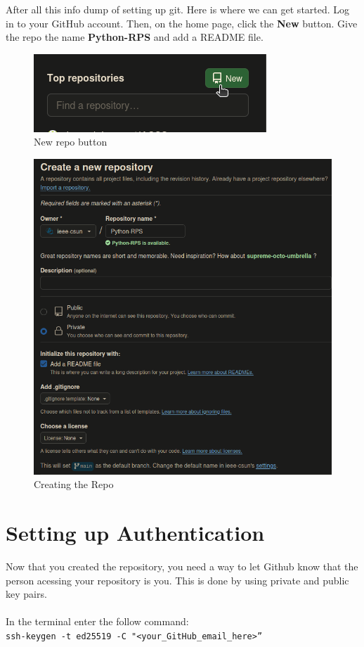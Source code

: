 \documentclass[12pt, a4paper]{article}
\begin{document}
After all this info dump of setting up git. Here is where we can get started. Log in to your GitHub account. Then, on the home page, click the \textbf{New} button. Give the repo the name \textbf{Python-RPS} and add a README file.
\begin{figure}[H]
\centering
\includegraphics[scale=0.5]{../images/workshop-I/GH-new-repo.png}
\caption{New repo button}
\end{figure}
\begin{figure}[H]
\centering
\includegraphics[scale=0.5]{../images/workshop-I/GH-create-repo.png}
\caption{Creating the Repo}
\end{figure}
\section{Setting up Authentication}

Now that you created the repository, you need a way to let Github know that the person acessing your repository is you. This is done by using private and public key pairs. \\\\
In the terminal enter the follow command:\\
\texttt{ssh-keygen -t ed25519 -C "<your\_GitHub\_email\_here>”}\\
\end{document}
